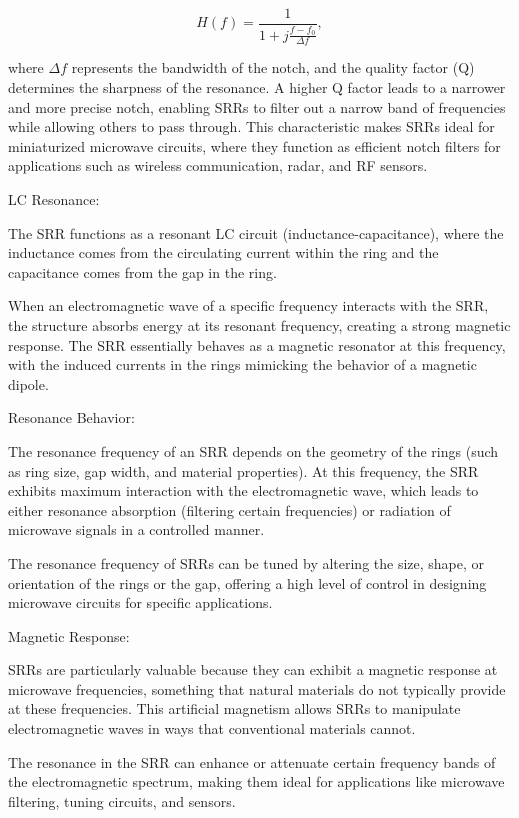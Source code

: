 \documentclass[conference]{IEEEtran}
\begin{document}
\[
H(f) = \frac{1}{1 + j \frac{f - f_0}{\Delta f}},
\]

where \( \Delta f \) represents the bandwidth of the notch, and the quality factor (Q) determines the sharpness of the resonance. A higher Q factor leads to a narrower and more precise notch, enabling SRRs to filter out a narrow band of frequencies while allowing others to pass through. This characteristic makes SRRs ideal for miniaturized microwave circuits, where they function as efficient notch filters for applications such as wireless communication, radar, and RF sensors.


LC Resonance:

The SRR functions as a resonant LC circuit (inductance-capacitance), where the inductance comes from the circulating current within the ring and the capacitance comes from the gap in the ring.

When an electromagnetic wave of a specific frequency interacts with the SRR, the structure absorbs energy at its resonant frequency, creating a strong magnetic response. The SRR essentially behaves as a magnetic resonator at this frequency, with the induced currents in the rings mimicking the behavior of a magnetic dipole.



Resonance Behavior:

The resonance frequency of an SRR depends on the geometry of the rings (such as ring size, gap width, and material properties). At this frequency, the SRR exhibits maximum interaction with the electromagnetic wave, which leads to either resonance absorption (filtering certain frequencies) or radiation of microwave signals in a controlled manner.

The resonance frequency of SRRs can be tuned by altering the size, shape, or orientation of the rings or the gap, offering a high level of control in designing microwave circuits for specific applications.

Magnetic Response:

SRRs are particularly valuable because they can exhibit a magnetic response at microwave frequencies, something that natural materials do not typically provide at these frequencies. This artificial magnetism allows SRRs to manipulate electromagnetic waves in ways that conventional materials cannot.

The resonance in the SRR can enhance or attenuate certain frequency bands of the electromagnetic spectrum, making them ideal for applications like microwave filtering, tuning circuits, and sensors.
\end{document}
